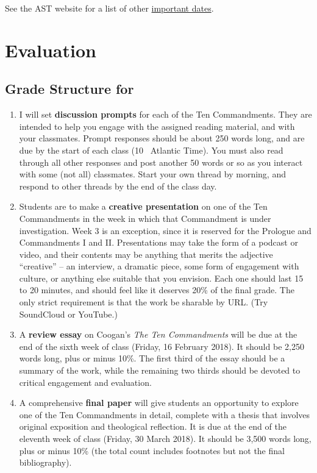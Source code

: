 \documentclass[titlepage]{article}
\begin{document}
See the AST website for a list of other \href{http://www.astheology.ns.ca/students/academic-dates.html}{important dates}.

\section{Evaluation}
\label{evaluation}

\subsection{Grade Structure for \ccode}
\label{structure}

\begin{enumerate}

	\item I will set \textbf{discussion prompts} for each of the Ten
	Commandments. They are intended to help you engage with the assigned
	reading material, and with your classmates. Prompt responses should
	be about 250 words long, and are due by the start of each class (10
	\AM\ Atlantic Time). You must also read through all other responses
	and post another 50 words or so as you interact with some (not all)
	classmates. Start your own thread by morning, and respond to other
	threads by the end of the class day.

	\item Students are to make a \textbf{creative presentation} on one
	of the Ten Commandments in the week in which that Commandment is
	under investigation. Week 3 is an exception, since it is reserved
	for the Prologue and Commandments I and II. Presentations may take
	the form of a podcast or video, and their contents may be anything
	that merits the adjective “creative” -- an interview, a dramatic
	piece, some form of engagement with culture, or anything else
	suitable that you envision. Each one should last 15 to 20 minutes,
	and should feel like it deserves 20\% of the final grade. The only
	strict requirement is that the work be sharable by URL. (Try
	SoundCloud or YouTube.)

	\item A \textbf{review essay} on Coogan's \emph{The Ten
	Commandments} will be due at the end of the sixth week of class
	(Friday, 16 February 2018). It should be 2,250 words long, plus or
	minus 10\%. The first third of the essay should be a summary of the
	work, while the remaining two thirds should be devoted to critical
	engagement and evaluation.

	\item A comprehensive \textbf{final paper} will give students an
	opportunity to explore one of the Ten Commandments in detail,
	complete with a thesis that involves original exposition and
	theological reflection. It is due at the end of the eleventh week of
	class (Friday, 30 March 2018). It should be 3,500 words long, plus
	or minus 10\% (the total count includes footnotes but not the final
	bibliography).

\end{enumerate}
\end{document}
